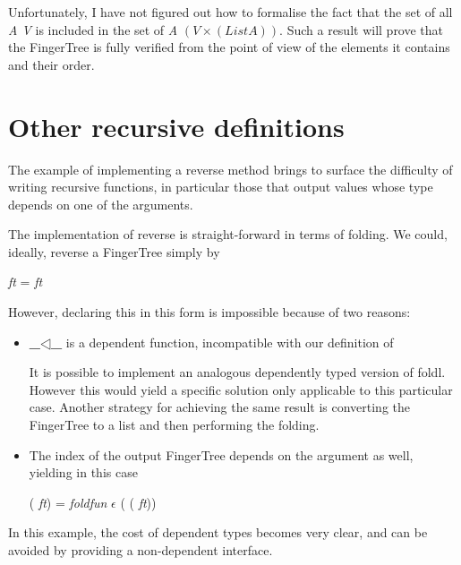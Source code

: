 \documentclass[12pt,twoside,notitlepage]{report}
\begin{document}
Unfortunately, I have not figured out how to formalise the fact that the set of all  \textit{A V} is included in the set of  \textit{A} $(V \times (List A))$. Such a result will prove that the FingerTree is fully verified from the point of view of the elements it contains and their order. 



\section{Other recursive definitions}

The example of implementing a reverse method brings to surface the difficulty of writing recursive functions, in particular those that output values whose type depends on one of the arguments.

The implementation of reverse is straight-forward in terms of folding. We could, ideally, reverse a FingerTree simply by 

\begin{center}
 \textit{ft} =    \textit{ft}
\end{center}

However, declaring this in this form is impossible because of two reasons:

\begin{itemize}
\item \textbf{\_$◁$\_} is a dependent function, incompatible with our definition of  \cite{foldl}

It is possible to implement an analogous dependently typed version of foldl. However this would yield a specific solution only applicable to this particular case.
Another strategy for achieving the same result is converting the FingerTree to a list and then performing the folding.
 
\item The index of the output FingerTree depends on the argument as well, yielding in this case 
\begin{center}
 ( \textit{ft}) =  \textit{foldfun} $\epsilon$ ( ( \textit{ft}))
\end{center}
\end{itemize}

In this example, the cost of dependent types becomes very clear, and can be avoided by providing a non-dependent interface.
\end{document}
